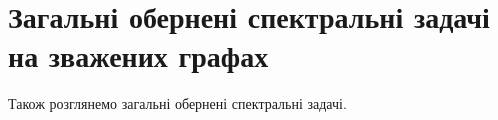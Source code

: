 \section{Загальні обернені спектральні задачі на зважених графах }
Також розглянемо загальні обернені спектральні задачі.



